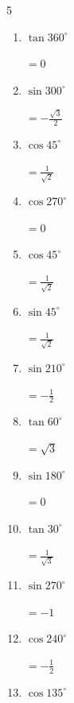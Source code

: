 \begin{multicols}{5}
\begin{enumerate}
        $\displaystyle =0$

  \item $\displaystyle \tan{360^\circ}$

        $\displaystyle =0$

  \item $\displaystyle \sin{300^\circ}$

        $\displaystyle =-\frac{\sqrt{3}}{2}$

  \item $\displaystyle \cos{45^\circ}$

        $\displaystyle =\frac{1}{\sqrt{2}}$

\columnbreak %

\resetques

  \item $\displaystyle \cos{270^\circ}$

        $\displaystyle =0$

  \item $\displaystyle \cos{45^\circ}$

        $\displaystyle =\frac{1}{\sqrt{2}}$

  \item $\displaystyle \sin{45^\circ}$

        $\displaystyle =\frac{1}{\sqrt{2}}$

  \item $\displaystyle \sin{210^\circ}$

        $\displaystyle =-\frac{1}{2}$

  \item $\displaystyle \tan{60^\circ}$

        $\displaystyle =\sqrt{3}$

  \item $\displaystyle \sin{180^\circ}$

        $\displaystyle =0$

  \item $\displaystyle \tan{30^\circ}$

        $\displaystyle =\frac{1}{\sqrt{3}}$

  \item $\displaystyle \sin{270^\circ}$

        $\displaystyle =-1$

  \item $\displaystyle \cos{240^\circ}$

        $\displaystyle =-\frac{1}{2}$

  \item $\displaystyle \cos{135^\circ}$


\end{enumerate}
\end{multicols}
